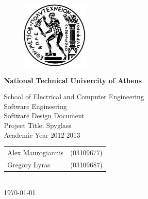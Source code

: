 \begin{titlepage}
\begin{center}
\begin{figure}[t] 
     \includegraphics[scale=0.7]{title/ntua_logo}
\end{figure}
\begin{LARGE}\textbf{National Technical Univercity of Athens\\}\end{LARGE}
\begin{Large}
School of Electrical and Computer Engineering\\
\vspace{2cm}
Software Engineering\\
Software Design Document\\
Project Title: Spyglass\\
Academic Year 2012-2013\\
\end{Large}
\vspace{11cm}
\begin{tabular}{l r}
\Large{Alex Maurogiannis}&
\large{(03109677)}\\
\Large{Gregory Lyras}&
\large{(03109687)}\\
\end{tabular}\\

\vfill
\large\today\\
\end{center}
\end{titlepage}

